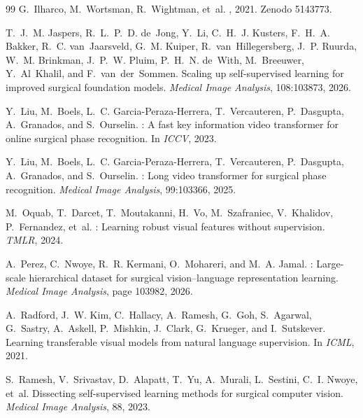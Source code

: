\documentclass[10pt,twocolumn]{article}
\begin{document}
\begin{thebibliography}{99}
G.~Ilharco, M.~Wortsman, R.~Wightman, et~al.
, 2021. Zenodo 5143773.

T.~J.~M. Jaspers, R.~L.~P.~D. de~Jong, Y.~Li, C.~H.~J. Kusters, F.~H.~A.
  Bakker, R.~C. van~Jaarsveld, G.~M. Kuiper, R.~van~Hillegersberg, J.~P.
  Ruurda, W.~M. Brinkman, J.~P.~W. Pluim, P.~H.~N. de~With, M.~Breeuwer,
  Y.~Al~Khalil, and F.~van~der~Sommen.
\newblock Scaling up self-supervised learning for improved surgical foundation
  models.
\newblock \emph{Medical Image Analysis}, 108:103873, 2026.

Y.~Liu, M.~Boels, L.~C. Garcia-Peraza-Herrera, T.~Vercauteren, P.~Dasgupta,
  A.~Granados, and S.~Ourselin.
: A fast key information video transformer for online surgical
  phase recognition.
\newblock In \emph{ICCV}, 2023.

Y.~Liu, M.~Boels, L.~C. Garcia-Peraza-Herrera, T.~Vercauteren, P.~Dasgupta,
  A.~Granados, and S.~Ourselin.
: Long video transformer for surgical phase recognition.
\newblock \emph{Medical Image Analysis}, 99:103366, 2025.

M.~Oquab, T.~Darcet, T.~Moutakanni, H.~Vo, M.~Szafraniec, V.~Khalidov,
  P.~Fernandez, et~al.
: Learning robust visual features without supervision.
\newblock \emph{TMLR}, 2024.

A.~Perez, C.~Nwoye, R.~R. Kermani, O.~Mohareri, and M.~A. Jamal.
: Large-scale hierarchical dataset for surgical
  vision--language representation learning.
\newblock \emph{Medical Image Analysis}, page 103982, 2026.

A.~Radford, J.~W. Kim, C.~Hallacy, A.~Ramesh, G.~Goh, S.~Agarwal, G.~Sastry,
  A.~Askell, P.~Mishkin, J.~Clark, G.~Krueger, and I.~Sutskever.
\newblock Learning transferable visual models from natural language
  supervision.
\newblock In \emph{ICML}, 2021.

S.~Ramesh, V.~Srivastav, D.~Alapatt, T.~Yu, A.~Murali, L.~Sestini, C.~I. Nwoye,
  et~al.
\newblock Dissecting self-supervised learning methods for surgical computer
  vision.
\newblock \emph{Medical Image Analysis}, 88, 2023.


\end{thebibliography}
\end{document}
